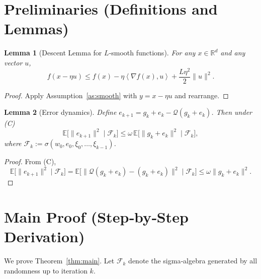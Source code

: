 \documentclass{article}
\newtheorem{lemma}{Lemma}
\newcommand{\E}{\mathbb{E}}
\newcommand{\R}{\mathbb{R}}
\newcommand{\inner}[2]{\left\langle #1,#2\right\rangle}
\newcommand{\Q}{\mathcal{Q}}
\begin{document}
\newpage

\section*{Preliminaries (Definitions and Lemmas)}
\begin{lemma}[Descent Lemma for $L$‑smooth functions]\label{lem:descent}
For any $x\in\R^{d}$ and any vector $u$,
\[
    f(x-\eta u)\le f(x)-\eta\inner{\nabla f(x)}{u}+\frac{L\eta^{2}}{2}\|u\|^{2}.
\]
\end{lemma}
\begin{proof}
Apply Assumption~\ref{as:smooth} with $y=x-\eta u$ and rearrange. \hfill\qedsymbol
\end{proof}

\begin{lemma}[Error dynamics]\label{lem:error}
Define $e_{k+1}=g_k+e_k-\Q(g_k+e_k)$. Then under (C)
\[
    \E\big[\|e_{k+1}\|^{2}\mid\mathcal{F}_k\big]
    \le \omega\,\E\big[\|g_k+e_k\|^{2}\mid\mathcal{F}_k\big],
\]
where $\mathcal{F}_k:=\sigma(w_0,e_0,\xi_0,\dots,\xi_{k-1})$.
\end{lemma}
\begin{proof}
From (C),
\[
    \E\big[\|e_{k+1}\|^{2}\mid\mathcal{F}_k\big]
    =\E\big[\|\Q(g_k+e_k)-(g_k+e_k)\|^{2}\mid\mathcal{F}_k\big]
    \le\omega\|g_k+e_k\|^{2}.
\] 
\hfill\qedsymbol
\end{proof}

\section*{Main Proof (Step‑by‑Step Derivation)}
We prove Theorem~\ref{thm:main}. Let $\mathcal{F}_k$ denote the sigma‑algebra generated by all randomness up to iteration $k$.
\end{document}
